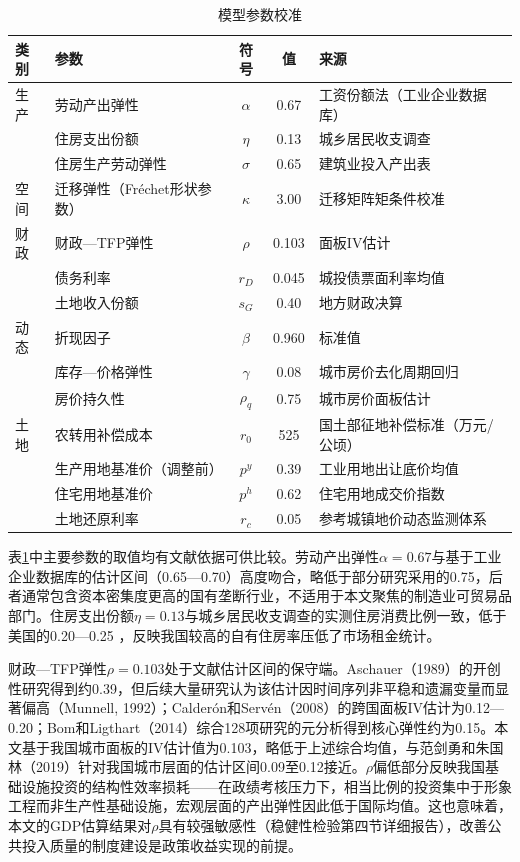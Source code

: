 \documentclass[UTF8,a4paper,12pt]{ctexart}
\theoremstyle{plain}
\theoremstyle{definition}
\theoremstyle{remark}
\begin{document}
\begin{table}[htbp]
  \centering
  \caption{模型参数校准}
  \label{tab:params}
  \begin{tabular}{llccl}
    \toprule
    类别 & 参数 & 符号 & 值 & 来源 \\
    \midrule
    生产 & 劳动产出弹性      & $\alpha$    & 0.67  & 工资份额法（工业企业数据库） \\
         & 住房支出份额      & $\eta$      & 0.13  & 城乡居民收支调查 \\
         & 住房生产劳动弹性  & $\sigma$    & 0.65  & 建筑业投入产出表 \\
    \midrule
    空间 & 迁移弹性（Fréchet形状参数）& $\kappa$    & 3.00  & 迁移矩阵矩条件校准 \\
    \midrule
    财政 & 财政—TFP弹性      & $\rho$      & 0.103 & 面板IV估计 \\
         & 债务利率          & $r_D$       & 0.045 & 城投债票面利率均值 \\
         & 土地收入份额      & $s_G$       & 0.40  & 地方财政决算 \\
    \midrule
    动态 & 折现因子          & $\beta$     & 0.960 & 标准值 \\
         & 库存—价格弹性    & $\gamma$    & 0.08  & 城市房价去化周期回归 \\
         & 房价持久性        & $\rho_q$    & 0.75  & 城市房价面板估计 \\
    \midrule
    土地 & 农转用补偿成本    & $r_0$       & 525   & 国土部征地补偿标准（万元/公顷） \\
         & 生产用地基准价（调整前）& $p^y$  & 0.39  & 工业用地出让底价均值 \\
         & 住宅用地基准价    & $p^h$       & 0.62  & 住宅用地成交价指数 \\
         & 土地还原利率      & $r_c$       & 0.05  & 参考城镇地价动态监测体系 \\
    \bottomrule
  \end{tabular}
\end{table}

表\ref{tab:params}中主要参数的取值均有文献依据可供比较。劳动产出弹性$\alpha=0.67$与\citet{bai2016}基于工业企业数据库的估计区间（0.65—0.70）高度吻合，略低于部分研究采用的0.75，后者通常包含资本密集度更高的国有垄断行业，不适用于本文聚焦的制造业可贸易品部门。住房支出份额$\eta=0.13$与城乡居民收支调查的实测住房消费比例一致，低于美国的0.20—0.25 \citep{favilukis2017}，反映我国较高的自有住房率压低了市场租金统计。

财政—TFP弹性$\rho=0.103$处于文献估计区间的保守端。Aschauer（1989）的开创性研究得到约0.39，但后续大量研究认为该估计因时间序列非平稳和遗漏变量而显著偏高（Munnell, 1992）；Calderón和Servén（2008）的跨国面板IV估计为0.12—0.20；Bom和Ligthart（2014）综合128项研究的元分析得到核心弹性约为0.15。本文基于我国城市面板的IV估计值为0.103，略低于上述综合均值，与范剑勇和朱国林（2019）针对我国城市层面的估计区间0.09至0.12接近。$\rho$偏低部分反映我国基础设施投资的结构性效率损耗——在政绩考核压力下，相当比例的投资集中于形象工程而非生产性基础设施，宏观层面的产出弹性因此低于国际均值。这也意味着，本文的GDP估算结果对$\rho$具有较强敏感性（稳健性检验第四节详细报告），改善公共投入质量的制度建设是政策收益实现的前提。
\end{document}
